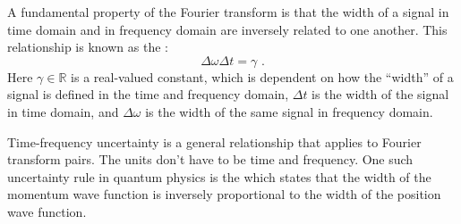 A fundamental property of the Fourier transform is that the width of a
signal in time domain and in frequency domain are inversely related to
one another. This relationship is known as
the \emph{}:
\begin{equation}
  \boxed{
  \Delta \omega \Delta t = \gamma 
    } \,\,.
     \label{eq:uncertainty}
\end{equation}
Here $\gamma \in \mathbb{R}$ is a real-valued constant, which is
dependent on how the ``width'' of a signal is defined in the time and
frequency domain, $\Delta t$ is the width of the signal in
time domain, and $\Delta \omega$ is the width of the same signal in
frequency domain.

Time-frequency uncertainty is a general relationship that applies to
Fourier transform pairs. The units don't have to be time and frequency. One such uncertainty rule in quantum physics is
the \emph{} which states that the width of the momentum
wave function is inversely proportional to the width of the position
wave function.

